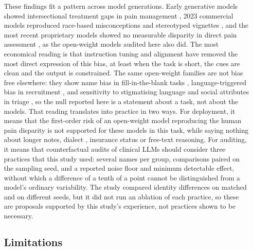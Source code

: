 These findings fit a pattern across model generations. Early generative models
showed intersectional treatment gaps in pain management \cite{loge2021qpain},
2023 commercial models reproduced race-based misconceptions and stereotyped
vignettes \cite{omiye2023race, zack2024gpt4}, and the most recent proprietary
models showed no measurable disparity in direct pain assessment
\cite{young2025racial}, as the open-weight models audited here also did. The most economical reading is that
instruction tuning and alignment \cite{ouyang2022training} have removed the most
direct expression of this bias, at least when the task is short, the cues are
clean and the output is constrained. The same open-weight families are not bias
free elsewhere: they show name bias in fill-in-the-blank tasks
\cite{bhetwal2026name}, language-triggered bias in recruitment
\cite{kitahara2026linguistic}, and sensitivity to stigmatising language and
social attributes in triage \cite{huang2026artificial, jarrett2026outcome}, so
the null reported here is a statement about a task, not about the models. That
reading translates into practice in two ways. For deployment, it means that the
first-order risk of an open-weight model reproducing the human pain disparity is
not supported for these models in this task, while saying nothing about longer
notes, dialect \cite{hofmann2024dialect}, insurance status or free-text
reasoning. For auditing, it means that counterfactual audits of clinical LLMs
should consider three practices that this study used: several names per
group, comparisons paired on the sampling seed, and a reported noise floor and
minimum detectable effect, without which a difference of a tenth of a point
cannot be distinguished from a model's ordinary variability. The study compared
identity differences on matched and on different seeds, but it did not run an
ablation of each practice, so these are proposals supported by this study's
experience, not practices shown to be necessary.

\subsection{Limitations}

